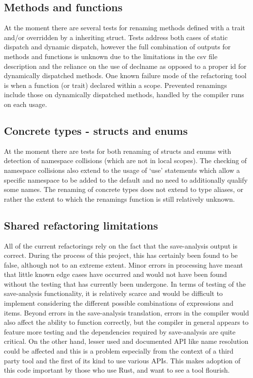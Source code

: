 \subsection{Methods and functions}
At the moment there are several tests for renaming methods defined with a trait and/or overridden by a inheriting struct. Tests address both cases of static dispatch and dynamic dispatch, however the full combination of outputs for methods and functions is unknown due to the limitations in the csv file description and the reliance on the use of declname as opposed to a proper id for dynamically dispatched methods. One known failure mode of the refactoring tool is when a function (or trait) declared within a scope. Prevented renamings include those on dynamically dispatched methods, handled by the compiler runs on each usage.

\subsection{Concrete types - structs and enums}
At the moment there are tests for both renaming of structs and enums with detection of namespace collisions (which are not in local scopes). The checking of namespace collisions also extend to the usage of `use' statements which allow a specific namespace to be added to the default and no need to additionally qualify some names. The renaming of concrete types does not extend to type aliases, or rather the extent to which the renamings function is still relatively unknown.

\subsection{Shared refactoring limitations}
All of the current refactorings rely on the fact that the save-analysis output is correct. During the process of this project, this has certainly been found to be false, although not to an extreme extent. Minor errors in processing have meant that little known edge cases have occurred and would not have been found without the testing that has currently been undergone. In terms of testing of the save-analysis functionality, it is relatively scarce and would be difficult to implement considering the different possible combinations of expressions and items. Beyond errors in the save-analysis translation, errors in the compiler would also affect the ability to function correctly, but the compiler in general appears to feature more testing and the dependencies required by save-analysis are quite critical. On the other hand, lesser used and documented API like name resolution could be affected and this is a problem especially from the context of a third party tool and the first of its kind to use various APIs. This makes adoption of this code important by those who use Rust, and want to see a tool flourish.

